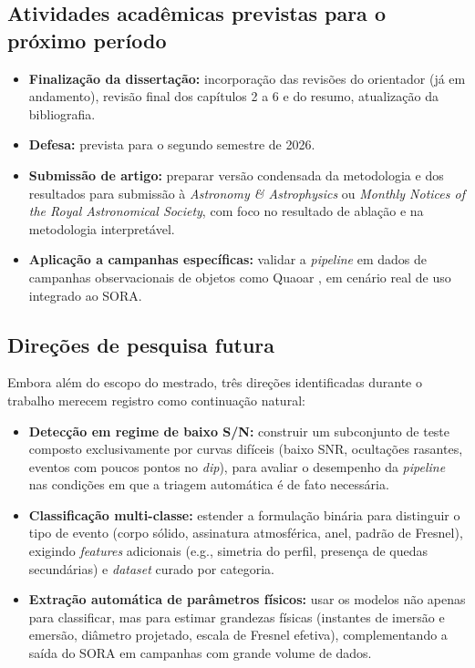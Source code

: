 \documentclass[12pt]{article}
\numberwithin{equation}{section}
\begin{document}
\subsection{Atividades acadêmicas previstas para o próximo período}

\begin{itemize}
    \item \textbf{Finalização da dissertação:} incorporação das revisões do orientador (já em andamento), revisão final dos capítulos 2 a 6 e do resumo, atualização da bibliografia.
    \item \textbf{Defesa:} prevista para o segundo semestre de 2026.
    \item \textbf{Submissão de artigo:} preparar versão condensada da metodologia e dos resultados para submissão à \textit{Astronomy \& Astrophysics} ou \textit{Monthly Notices of the Royal Astronomical Society}, com foco no resultado de ablação e na metodologia interpretável.
    \item \textbf{Aplicação a campanhas específicas:} validar a \textit{pipeline} em dados de campanhas observacionais de objetos como Quaoar \citep{Quaoar2023}, em cenário real de uso integrado ao SORA.
\end{itemize}

\subsection{Direções de pesquisa futura}

Embora além do escopo do mestrado, três direções identificadas durante o trabalho merecem registro como continuação natural:

\begin{itemize}
    \item \textbf{Detecção em regime de baixo S/N:} construir um subconjunto de teste composto exclusivamente por curvas difíceis (baixo SNR, ocultações rasantes, eventos com poucos pontos no \textit{dip}), para avaliar o desempenho da \textit{pipeline} nas condições em que a triagem automática é de fato necessária.

    \item \textbf{Classificação multi-classe:} estender a formulação binária para distinguir o tipo de evento (corpo sólido, assinatura atmosférica, anel, padrão de Fresnel), exigindo \textit{features} adicionais (e.g., simetria do perfil, presença de quedas secundárias) e \textit{dataset} curado por categoria.

    \item \textbf{Extração automática de parâmetros físicos:} usar os modelos não apenas para classificar, mas para estimar grandezas físicas (instantes de imersão e emersão, diâmetro projetado, escala de Fresnel efetiva), complementando a saída do SORA em campanhas com grande volume de dados.
\end{itemize}

\newpage



\end{document}
